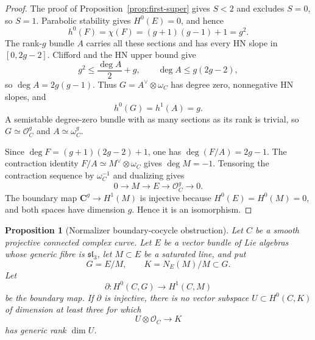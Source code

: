 \documentclass[11pt]{article}
\newtheorem{proposition}[theorem]{Proposition}
\theoremstyle{definition}
\newcommand{\C}{\mathbf C}
\newcommand{\Ocal}{\mathcal O}
\begin{document}
\begin{proof}
The proof of Proposition~\ref{prop:first-super} gives $S<2$ and excludes
$S=0$, so $S=1$.  Parabolic stability gives $H^0(E)=0$, and hence
\[
 h^0(F)=\chi(F)=(g+1)(g-1)+1=g^2.
\]
The rank-$g$ bundle $A$ carries all these sections and has every HN slope in
$[0,2g-2]$.  Clifford and the HN upper bound give
\[
 g^2\le\frac{\deg A}{2}+g,
 \qquad
 \deg A\le g(2g-2),
\]
so $\deg A=2g(g-1)$.  Thus
$G=A^\vee\otimes\omega_C$ has degree zero, nonnegative HN slopes, and
\[
 h^0(G)=h^1(A)=g.
\]
A semistable degree-zero bundle with as many sections as its rank is trivial,
so $G\simeq\Ocal_C^g$ and $A\simeq\omega_C^g$.

Since $\deg F=(g+1)(2g-2)+1$, one has $\deg(F/A)=2g-1$.  The contraction
identity $F/A\simeq M^\vee\otimes\omega_C$ gives $\deg M=-1$.  Tensoring the
contraction sequence by $\omega_C^{-1}$ and dualizing gives
\[
 0\to M\to E\to\Ocal_C^g\to0.
\]
The boundary map $\C^g\to H^1(M)$ is injective because
$H^0(E)=H^0(M)=0$, and both spaces have dimension $g$.  Hence it is an
isomorphism.
\end{proof}

\begin{proposition}[Normalizer boundary-cocycle obstruction]
\label{prop:normalizer-boundary}
Let $C$ be a smooth projective connected complex curve.  Let $E$ be a
vector bundle of Lie algebras whose generic fibre is
$\mathfrak{sl}_3$, let $M\subset E$ be a saturated line, and put
\[
 G=E/M,\qquad K=N_E(M)/M\subset G.
\]
Let
\[
 \partial:H^0(C,G)\longrightarrow H^1(C,M)
\]
be the boundary map.  If $\partial$ is injective, there is no vector
subspace $U\subset H^0(C,K)$ of dimension at least three for which
\[
 U\otimes\Ocal_C\longrightarrow K
\]
has generic rank $\dim U$.
\end{proposition}
\end{document}
